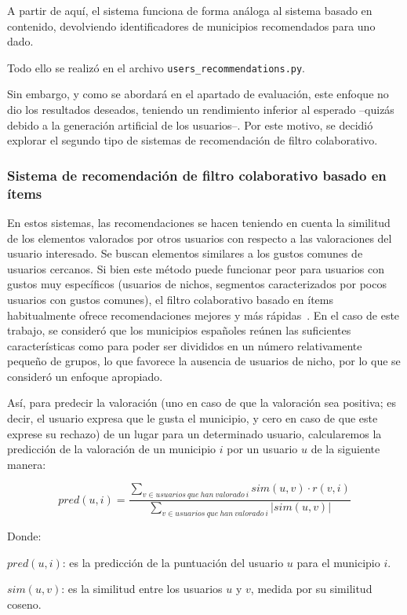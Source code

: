 A partir de aquí, el sistema funciona de forma análoga al sistema basado en contenido, devolviendo identificadores de municipios recomendados para uno dado.

Todo ello se realizó en el archivo \texttt{users\_recommendations.py}.

Sin embargo, y como se abordará en el apartado de evaluación, este enfoque no dio los resultados deseados, teniendo un rendimiento inferior al esperado –quizás debido a la generación artificial de los usuarios–. Por este motivo, se decidió explorar el segundo tipo de sistemas de recomendación de filtro colaborativo.

\subsubsection{Sistema de recomendación de filtro colaborativo basado en ítems}

En estos sistemas, las recomendaciones se hacen teniendo en cuenta la similitud de los elementos valorados por otros usuarios con respecto a las valoraciones del usuario interesado. Se buscan elementos similares a los gustos comunes de usuarios cercanos. Si bien este método puede funcionar peor para usuarios con gustos muy específicos (usuarios de nichos, segmentos caracterizados por pocos usuarios con gustos comunes), el filtro colaborativo basado en ítems habitualmente ofrece recomendaciones mejores y más rápidas~\cite{filtro_colaborativo_2}. En el caso de este trabajo, se consideró que los municipios españoles reúnen las suficientes características como para poder ser divididos en un número relativamente pequeño de grupos, lo que favorece la ausencia de usuarios de nicho, por lo que se consideró un enfoque apropiado.

Así, para predecir la valoración (uno en caso de que la valoración sea positiva; es decir, el usuario expresa que le gusta el municipio, y cero en caso de que este exprese su rechazo) de un lugar para un determinado usuario, calcularemos la predicción de la valoración de un municipio $i$ por un usuario $u$ de la siguiente manera:

$$pred(u, i) = \frac{\sum_{v \in usuarios \ que \ han \ valorado \ i} sim(u, v) \cdot r(v, i)}{\sum_{v \in usuarios \ que \ han \ valorado \ i} |sim(u, v)|}$$

Donde:

$pred(u, i)$: es la predicción de la puntuación del usuario $u$ para el municipio $i$.

$sim(u, v)$: es la similitud entre los usuarios $u$ y $v$, medida por su similitud coseno.

